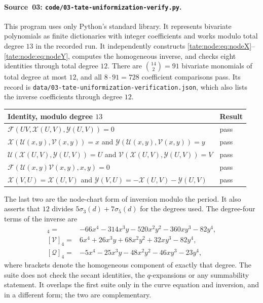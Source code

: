 \documentclass[11pt,letterpaper]{article}
\theoremstyle{definition}
\newcommand{\file}[1]{\nolinkurl{#1}}
\newcommand{\X}{\mathcal X}
\newcommand{\Y}{\mathcal Y}
\newcommand{\UU}{\mathcal U}
\newcommand{\VV}{\mathcal V}
\newcommand{\QQ}{\mathcal Q}
\newcommand{\Fp}{\mathcal F}
\begin{document}
\paragraph{Source~03: \texttt{code/03-tate-uniformization-verify.py}.}
This program uses only Python's standard library. It represents bivariate
polynomials as finite dictionaries with integer coefficients and works
modulo total degree $13$ in the recorded run. It independently constructs
\eqref{tate:node:eq:nodeX}--\eqref{tate:node:eq:nodeY}, computes the
homogeneous inverse, and checks eight identities through total degree $12$.
There are $\binom{14}{2}=91$ bivariate monomials of total degree at most
$12$, and all $8\cdot91=728$ coefficient comparisons pass. Its record is
\file{data/03-tate-uniformization-verification.json}, which also lists the
inverse coefficients through degree $12$.
\begin{center}
\begin{tabular}{@{}p{}l@{}}
\toprule
Identity, modulo degree $13$ & Result\\
\midrule
$\Fp(UV,\X(U,V),\Y(U,V))=0$ & pass\\
$\X(\UU(x,y),\VV(x,y))=x$ and $\Y(\UU(x,y),\VV(x,y))=y$ & pass\\
$\UU(\X(U,V),\Y(U,V))=U$ and $\VV(\X(U,V),\Y(U,V))=V$ & pass\\
$\Fp(\UU(x,y)\VV(x,y),x,y)=0$ & pass\\
$\X(V,U)=\X(U,V)$ and $\Y(V,U)=-\X(U,V)-\Y(U,V)$ & pass\\
\bottomrule
\end{tabular}
\end{center}
The last two are the node-chart form of inversion modulo the period. It
also asserts that $12$ divides $5\sigma_3(d)+7\sigma_5(d)$ for the degrees
used. The degree-four terms of the inverse are
\begin{align*}
 [\UU]_4={}&-66x^4-314x^3y-520x^2y^2-360xy^3-82y^4,\\
 [\VV]_4={}&6x^4+26x^3y+68x^2y^2+32xy^3-82y^4,\\
 [\QQ]_4={}&-5x^4-25x^3y-48x^2y^2-46xy^3-23y^4,
\end{align*}
where brackets denote the homogeneous component of exactly that degree.
The suite does not check the secant identities, the $q$-expansions or any
summability statement. It overlaps the first suite only in the curve
equation and inversion, and in a different form; the two are complementary.
\end{document}
